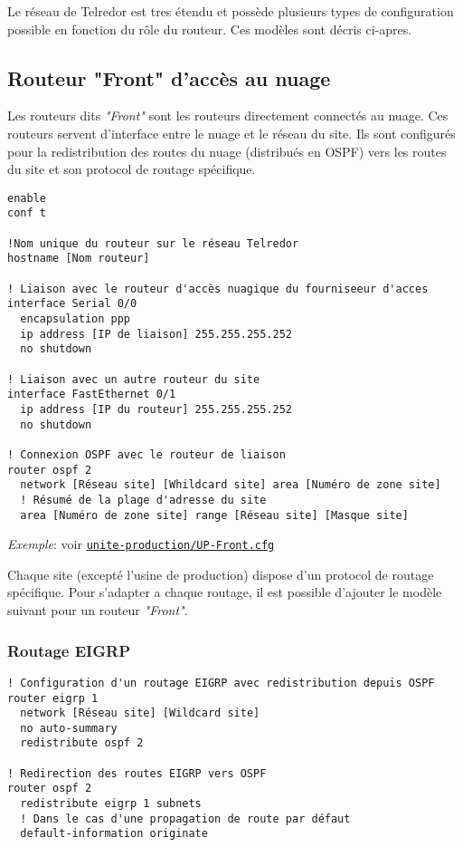 \documentclass{article}
\newcommand{\tlr}{Telredor\xspace}
\newcommand{\seefile}[1]{
  \begin{center}
  \begin{minipage}{0.9\textwidth}
    \emph{Exemple}: voir \texttt{\href{https://github.com/EpicKiwi/Wide-Network-Project-Cesi-A4/blob/master/network/#1}{#1}}
  \end{minipage}
  \end{center}
}
\begin{document}
Le réseau de \tlr est tres étendu et possède plusieurs types de configuration possible en fonction du rôle du routeur.
Ces modèles sont décris ci-apres.

\subsection{Routeur "Front" d'accès au nuage}

Les routeurs dits \emph{"Front"} sont les routeurs directement connectés au nuage.
Ces routeurs servent d'interface entre le nuage et le réseau du site.
Ils sont configurés pour la redistribution des routes du nuage (distribués en OSPF) vers les routes du site et son protocol de routage spécifique.

\begin{lstlisting}[caption=Modèle de configuration d'un routeur "Front"]
enable
conf t

!Nom unique du routeur sur le réseau Telredor
hostname [Nom routeur]

! Liaison avec le routeur d'accès nuagique du fourniseeur d'acces
interface Serial 0/0
  encapsulation ppp
  ip address [IP de liaison] 255.255.255.252
  no shutdown

! Liaison avec un autre routeur du site
interface FastEthernet 0/1
  ip address [IP du routeur] 255.255.255.252
  no shutdown

! Connexion OSPF avec le routeur de liaison
router ospf 2
  network [Réseau site] [Whildcard site] area [Numéro de zone site]
  ! Résumé de la plage d'adresse du site
  area [Numéro de zone site] range [Réseau site] [Masque site]
\end{lstlisting}

\seefile{unite-production/UP-Front.cfg}

Chaque site (excepté l'usine de production) dispose d'un protocol de routage spécifique.
Pour s'adapter a chaque routage, il est possible d'ajouter le modèle suivant pour un routeur \emph{"Front"}.

\subsubsection{Routage EIGRP}

\begin{lstlisting}[caption=Configuration d'un routeur "Front" avec EIGRP]
! Configuration d'un routage EIGRP avec redistribution depuis OSPF
router eigrp 1
  network [Réseau site] [Wildcard site]
  no auto-summary
  redistribute ospf 2

! Redirection des routes EIGRP vers OSPF
router ospf 2
  redistribute eigrp 1 subnets
  ! Dans le cas d'une propagation de route par défaut
  default-information originate
\end{lstlisting}
\end{document}
